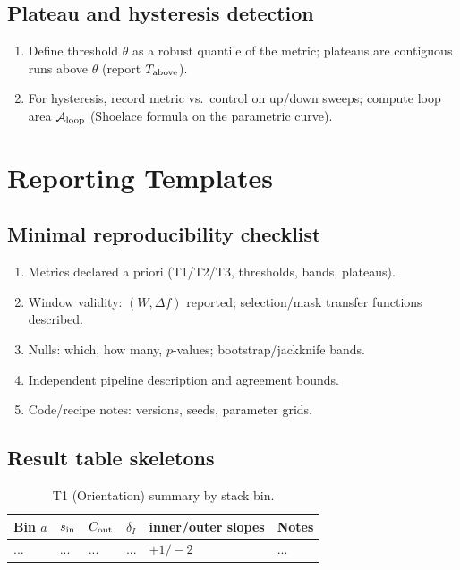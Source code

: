 \documentclass[12pt,a4paper,oneside]{scrreprt}
\begin{document}
\section*{Plateau and hysteresis detection}
\begin{enumerate}
\item Define threshold $\theta$ as a robust quantile of the metric; plateaus are contiguous runs above $\theta$ (report $T_{\rm above}$).
\item For hysteresis, record metric vs.\ control on up/down sweeps; compute loop area $\mathcal A_{\rm loop}$ (Shoelace formula on the parametric curve).
\end{enumerate}

\chapter{Reporting Templates}\label{app:report}
\section*{Minimal reproducibility checklist}
\begin{enumerate}
\item Metrics declared a priori (T1/T2/T3, thresholds, bands, plateaus).
\item Window validity: $(W,\Delta f)$ reported; selection/mask transfer functions described.
\item Nulls: which, how many, $p$-values; bootstrap/jackknife bands.
\item Independent pipeline description and agreement bounds.
\item Code/recipe notes: versions, seeds, parameter grids.
\end{enumerate}

\section*{Result table skeletons}
\begin{table}[htbp]\centering
\caption{T1 (Orientation) summary by stack bin.}
\begin{tabular}{llllll}\toprule
Bin $a$ & $s_{\rm in}$ & $C_{\rm out}$ & $\delta_I$ & inner/outer slopes & Notes \\\midrule
... & ... & ... & ... & $+1 / -2$ & ...\\ \bottomrule
\end{tabular}
\end{table}
\end{document}
